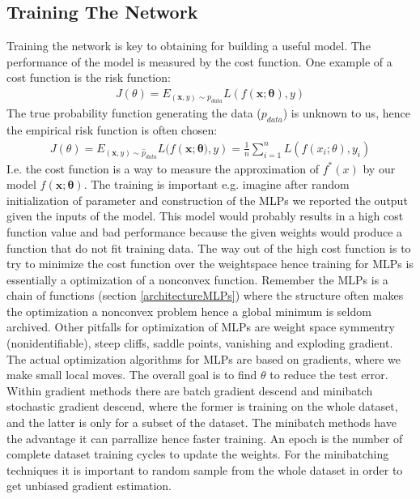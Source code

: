 \subsection{Training The Network}\label{trainNetwork}
Training the network is key to obtaining for building a useful model. The performance of the model is measured by the cost function. One example of a cost function is the risk function:
\begin{align*}
J(\theta)=E_{(\bm{x},y)\sim p_{data}} L(f(\bm{x};\bm{\theta}),y)
\end{align*}
The true probability function generating the data ($p_{data}$) is unknown to us, hence the empirical risk function is often chosen:
\begin{align*}
J(\theta)=E_{(\bm{x},y)\sim \hat{p}_{data}} L(f(\bm{x};\bm{\theta)},y)= \frac{1}{n}\sum_{i=1}^{n} L(f(x_i;\theta),y_i)
\end{align*}
I.e. the cost function is a way to measure the approximation of $f^*(x)$ by our model $f(\bm{x};\bm{\theta})$. The training is important e.g. imagine after random initialization of parameter and construction of the MLPs we reported the output given the inputs of the model. This model would probably results in a high cost function value and bad performance because the given weights would produce a function that do not fit training data. The way out of the high cost function is to try to minimize the cost function over the weightspace hence training for MLPs is essentially a optimization of a nonconvex function. Remember the MLPs is a chain of functions (section \ref{architectureMLPs}) where the structure often makes the optimization a nonconvex problem hence a global minimum is seldom archived. Other pitfalls for optimization of MLPs are weight space symmentry (nonidentifiable), steep cliffs, saddle points, vanishing and exploding gradient.\\

The actual optimization algorithms for MLPs are based on gradients, where we make small local moves. The overall goal is to find $\theta$ to reduce the test error. Within gradient methods there are batch gradient descend and minibatch stochastic gradient descend, where the former is training on the whole dataset, and the latter is only for a subset of the dataset. The minibatch methods have the advantage it can parrallize hence faster training. An epoch is the number of complete dataset training cycles to update the weights. For the minibatching techniques it is important to random sample from the whole dataset in order to get unbiased gradient estimation. \\

